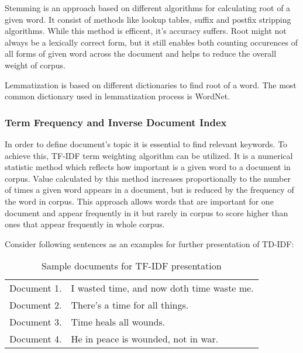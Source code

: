 Stemming is an approach based on different algorithms for calculating root of a given word. It consist of methods like lookup tables, suffix and postfix stripping algorithms. While this method is efficent, it's accuracy suffers. Root might not always be a lexically correct form, but it still enables both counting occurences of all forms of given word across the document and helps to reduce the overall weight of corpus.

Lemmatization is based on different dictionaries to find root of a word. The most common dictionary used in lemmatization process is WordNet.

\subsubsection{Term Frequency and Inverse Document Index}
In order to define document's topic it is essential to find relevant keywords. To achieve this, TF-IDF term weighting algorithm can be utilized. It is a numerical statistic method which reflects how important is a given word to a document in corpus. Value calculated by this method increases proportionally to the number of times a given word appears in a document, but is reduced by the frequency of the word in corpus. This approach allows words that are important for one document and appear frequently in it but rarely in corpus to score higher than ones that appear frequently in whole corpus.

Consider following sentences as an examples for further presentation of TD-IDF:

\begin{table}[ht]
	\centering
	\caption{Sample documents for TF-IDF presentation}
	\label{my-label}
	\begin{tabular}{ll}
		Document 1. & I wasted time, and now doth time waste me. \\
		Document 2. & There's a time for all things.             \\
		Document 3. & Time heals all wounds.                     \\
		Document 4. & He in peace is wounded, not in war.       
	\end{tabular}
\end{table}

